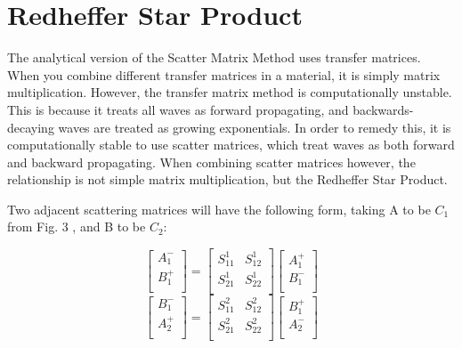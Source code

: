 \section{Redheffer Star Product}\label{sec:redStar}
The analytical version of the Scatter Matrix Method uses transfer matrices.  
When you combine different transfer matrices in a material, it is simply matrix 
multiplication.  However, the transfer matrix method is computationally unstable.  
This is because it treats all waves as forward propagating, and backwards-decaying 
waves are treated as growing exponentials.  In order 
to remedy this, it is computationally stable to use scatter matrices, which 
treat waves as both forward and backward propagating.  When combining scatter 
matrices however, the relationship is not simple matrix multiplication, but the 
Redheffer Star Product.  

Two adjacent scattering matrices will have the following form, taking A to be 
$C_1$ from Fig. 3 %
, and B to be $C_2$: 

  \begin{equation}
 \left[ {\begin{array}{c}
               A_1^- \\
               B_1^+ \\
               \end{array} } \right]
            = \left[ {\begin{array}{cc}
               S_{11}^1 & S_{12}^1 \\
               S_{21}^1 & S_{22}^1 \\
               \end{array} } \right]
            \left[ {\begin{array}{c}
               A_1^+ \\
               B_1^- \\
               \end{array} } \right]
    \label{eq:17}
    \end{equation}
  \begin{equation}
 \left[ {\begin{array}{c}
               B_1^- \\
               A_2^+ \\
               \end{array} } \right]
            = \left[ {\begin{array}{cc}
               S_{11}^2 & S_{12}^2 \\
               S_{21}^2 & S_{22}^2 \\
               \end{array} } \right]
            \left[ {\begin{array}{c}
               B_1^+ \\
               A_2^- \\
               \end{array} } \right]
    \label{eq:18}
    \end{equation}

